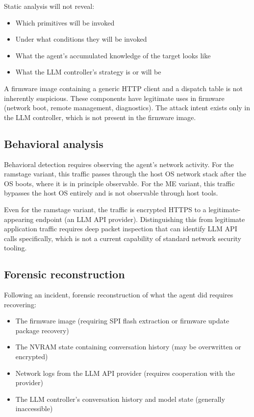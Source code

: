 \documentclass[11pt,a4paper]{article}
\begin{document}
Static analysis will not reveal:

\begin{itemize}[noitemsep]
\item Which primitives will be invoked
\item Under what conditions they will be invoked
\item What the agent's accumulated knowledge of the target looks like
\item What the LLM controller's strategy is or will be
\end{itemize}

A firmware image containing a generic HTTP client and a dispatch table is not inherently suspicious. These components have legitimate uses in firmware (network boot, remote management, diagnostics). The attack intent exists only in the LLM controller, which is not present in the firmware image.

\subsection{Behavioral analysis}

Behavioral detection requires observing the agent's network activity. For the ramstage variant, this traffic passes through the host OS network stack after the OS boots, where it is in principle observable. For the ME variant, this traffic bypasses the host OS entirely and is not observable through host tools.

Even for the ramstage variant, the traffic is encrypted HTTPS to a legitimate-appearing endpoint (an LLM API provider). Distinguishing this from legitimate application traffic requires deep packet inspection that can identify LLM API calls specifically, which is not a current capability of standard network security tooling.

\subsection{Forensic reconstruction}

Following an incident, forensic reconstruction of what the agent did requires recovering:

\begin{itemize}[noitemsep]
\item The firmware image (requiring SPI flash extraction or firmware update package recovery)
\item The NVRAM state containing conversation history (may be overwritten or encrypted)
\item Network logs from the LLM API provider (requires cooperation with the provider)
\item The LLM controller's conversation history and model state (generally inaccessible)
\end{itemize}
\end{document}

